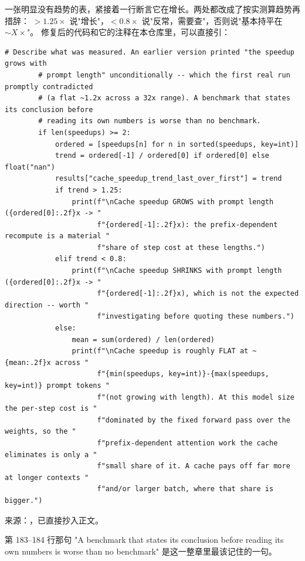 一张明显没有趋势的表，紧接着一行断言它在增长。两处都改成了按实测算趋势再措辞：
$>1.25\times$ 说"增长"，$<0.8\times$ 说"反常，需要查"，否则说"基本持平在 $\sim X\times$"。
修复后的代码和它的注释在本仓库里，可以直接引：

\begin{lstlisting}[style=hlnum, firstnumber=181]
        # Describe what was measured. An earlier version printed "the speedup grows with
        # prompt length" unconditionally -- which the first real run promptly contradicted
        # (a flat ~1.2x across a 32x range). A benchmark that states its conclusion before
        # reading its own numbers is worse than no benchmark.
        if len(speedups) >= 2:
            ordered = [speedups[n] for n in sorted(speedups, key=int)]
            trend = ordered[-1] / ordered[0] if ordered[0] else float("nan")
            results["cache_speedup_trend_last_over_first"] = trend
            if trend > 1.25:
                print(f"\nCache speedup GROWS with prompt length ({ordered[0]:.2f}x -> "
                      f"{ordered[-1]:.2f}x): the prefix-dependent recompute is a material "
                      f"share of step cost at these lengths.")
            elif trend < 0.8:
                print(f"\nCache speedup SHRINKS with prompt length ({ordered[0]:.2f}x -> "
                      f"{ordered[-1]:.2f}x), which is not the expected direction -- worth "
                      f"investigating before quoting these numbers.")
            else:
                mean = sum(ordered) / len(ordered)
                print(f"\nCache speedup is roughly FLAT at ~{mean:.2f}x across "
                      f"{min(speedups, key=int)}-{max(speedups, key=int)} prompt tokens "
                      f"(not growing with length). At this model size the per-step cost is "
                      f"dominated by the fixed forward pass over the weights, so the "
                      f"prefix-dependent attention work the cache eliminates is only a "
                      f"small share of it. A cache pays off far more at longer contexts "
                      f"and/or larger batch, where that share is bigger.")
\end{lstlisting}
\noindent 来源：，已直接抄入正文。

第 183--184 行那句 "A benchmark that states its conclusion before reading its own numbers
is worse than no benchmark" 是这一整章里最该记住的一句。


